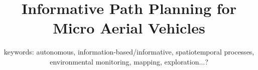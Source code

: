 \documentclass[10pt,twoside,a4paper]{article}
\begin{document}
\title{Informative Path Planning for Micro Aerial Vehicles}
\subtitle{\normalsize{keywords: autonomous, 
information-based/informative, spatiotemporal processes, environmental 
monitoring, mapping, exploration...?}}


\maketitle
\pagestyle{plain}


\cleardoublepage

\pagestyle{fancy}






%



\end{document}
